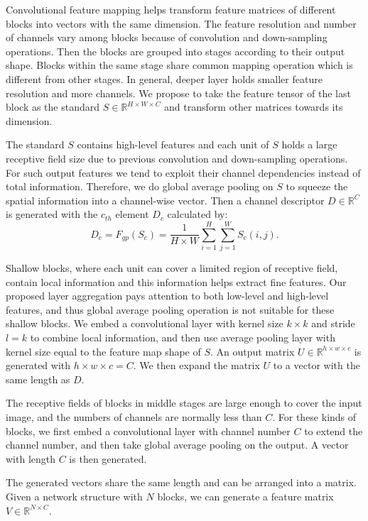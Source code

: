 \documentclass[runningheads]{llncs}
\begin{document}
Convolutional feature mapping helps transform feature matrices of different blocks into vectors with the same dimension. The feature resolution and number of channels vary among blocks because of convolution and down-sampling operations. Then the blocks are grouped into stages according to their output shape. Blocks within the same stage share common mapping operation which is different from other stages. In general, deeper layer holds smaller feature resolution and more channels. We propose to take the feature tensor of the last block as the standard $S \in \mathbb{R}^{H\times W \times C}$ and transform other matrices towards its dimension. 

The standard $S$ contains high-level features and each unit of $S$ holds a large receptive field size due to previous convolution and down-sampling operations. For such output features we tend to exploit their channel dependencies instead of total information. Therefore, we do global average pooling on $S$ to squeeze the spatial information into a channel-wise vector. Then a channel descriptor $D\in \mathbb{R}^C$ is generated with the $c_{th}$ element $D_c$ calculated by:
\begin{equation}
D_c = F_{gp}(S_c) = \frac{1}{H\times W}\sum_{i=1}^H\sum_{j=1}^W S_c(i,j).
\end{equation}

Shallow blocks, where each unit can cover a limited region of receptive field, contain local information and this information helps extract fine features. Our proposed layer aggregation pays attention to both low-level and high-level features,  and thus global average pooling operation is not suitable for these shallow blocks. We embed a convolutional layer with kernel size $k\times k$ and stride $l=k$ to combine local information, and then use average pooling layer with kernel size equal to the feature map shape of $S$.  An output matrix $U\in \mathbb{R}^{h\times w\times c}$ is generated with $h\times w\times c=C$.  We then expand the matrix $U$ to a vector with the same length as $D$.

The receptive fields of  blocks in middle stages are large enough to cover the input image, and the numbers of channels are normally less than $C$. For these kinds of blocks, we first embed a convolutional layer with channel number $C$ to extend the channel number, and then take global average pooling on the output. A vector with length $C$ is then generated.

The generated vectors share the same length and can be arranged into a matrix. Given a network structure with $N$ blocks, we can generate a feature matrix $V\in \mathbb{R}^{N\times C}$.
\end{document}
